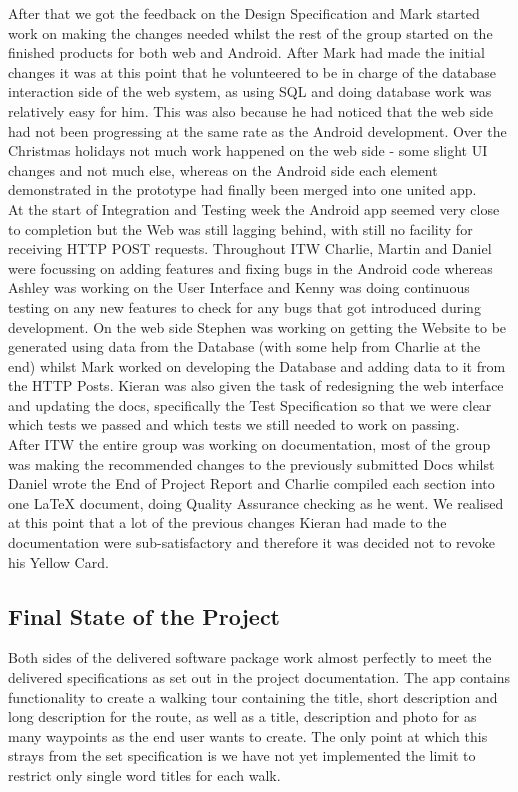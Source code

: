 \documentclass{article}
\begin{document}
		After that we got the feedback on the Design Specification and Mark started work on making the changes needed whilst the rest of the group started on the finished products for both web and Android. After Mark had made the initial changes it was at this point that he volunteered to be in charge of the database interaction side of the web system, as using SQL and doing database work was relatively easy for him. This was also because he had noticed that the web side had not been progressing at the same rate as the Android development. Over the Christmas holidays not much work happened on the web side - some slight UI changes and not much else, whereas on the Android side each element demonstrated in the prototype had finally been merged into one united app. \\

		At the start of Integration and Testing week the Android app seemed very close to completion but the Web was still lagging behind, with still no facility for receiving HTTP POST requests. Throughout ITW Charlie, Martin and Daniel were focussing on adding features and fixing bugs in the Android code whereas Ashley was working on the User Interface and Kenny was doing continuous testing on any new features to check for any bugs that got introduced during development. On the web side Stephen was working on getting the Website to be generated using data from the Database (with some help from Charlie at the end) whilst Mark worked on developing the Database and adding data to it from the HTTP Posts. Kieran was also given the task of redesigning the web interface and updating the docs, specifically the Test Specification so that we were clear which tests we passed and which tests we still needed to work on passing. \\

		After ITW the entire group was working on documentation, most of the group was making the recommended changes to the previously submitted Docs whilst Daniel wrote the End of Project Report and Charlie compiled each section into one LaTeX document, doing Quality Assurance checking as he went. We realised at this point that a lot of the previous changes Kieran had made to the documentation were sub-satisfactory and therefore it was decided not to revoke his Yellow Card.

		\newpage
		\subsection{Final State of the Project}
		Both sides of the delivered software package work almost perfectly to meet the delivered specifications as set out in the project documentation. 
		The app contains functionality to create a walking tour containing the title, short description and long description for the route, as well as a title, description and photo for as many waypoints as the end user wants to create. The only point at which this strays from the set specification is we have not yet implemented the limit to restrict only single word titles for each walk. \\
		
\end{document}
